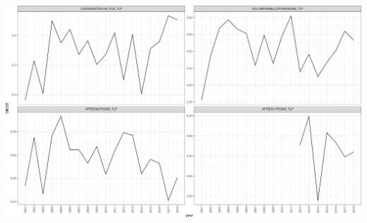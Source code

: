 \documentclass[10pt,landscape,a3paper]{article}
\begin{document}
\begin{center}\includegraphics{img/modelling/transformations-1} \end{center}
\end{document}
